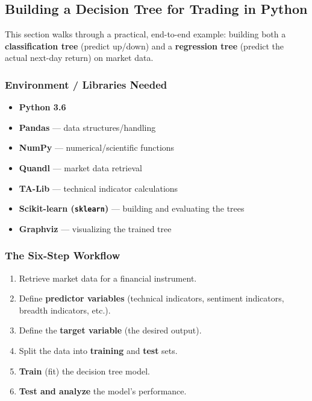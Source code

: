 \documentclass[12pt,openany]{book}
\begin{document}
\medskip


\subsection{Building a Decision Tree for Trading in Python}


This section walks through a practical, end-to-end example: building both a \textbf{classification tree} (predict up/down) and a \textbf{regression tree} (predict the actual next-day return) on market data.

\subsubsection{Environment / Libraries Needed}

\begin{itemize}[leftmargin=*]
    \item \textbf{Python 3.6}
    \item \textbf{Pandas} --- data structures/handling
    \item \textbf{NumPy} --- numerical/scientific functions
    \item \textbf{Quandl} --- market data retrieval
    \item \textbf{TA-Lib} --- technical indicator calculations
    \item \textbf{Scikit-learn (\texttt{sklearn})} --- building and evaluating the trees
    \item \textbf{Graphviz} --- visualizing the trained tree
\end{itemize}


\subsubsection{The Six-Step Workflow}

\begin{enumerate}[leftmargin=*]
    \item Retrieve market data for a financial instrument.
    \item Define \textbf{predictor variables} (technical indicators, sentiment indicators, breadth indicators, etc.).
    \item Define the \textbf{target variable} (the desired output).
    \item Split the data into \textbf{training} and \textbf{test} sets.
    \item \textbf{Train} (fit) the decision tree model.
    \item \textbf{Test and analyze} the model's performance.

\end{enumerate}
\end{document}
